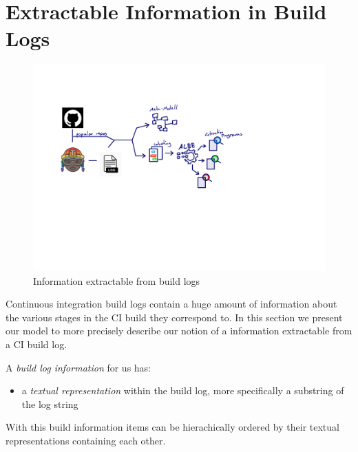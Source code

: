 \documentclass[\myrootdir/main.tex]{subfiles}
\begin{document}
\section{Extractable Information in Build Logs}
\begin{figure}[h]
  \centering
\includegraphics[page=2, width=\textwidth, trim={0.5cm 0.5cm 0.5cm 0.5cm}, clip]{img/flow-of-research.pdf}
  \caption{Information extractable from build logs}
  \label{fig:build-log-information-draft}
\end{figure}
Continuous integration build logs contain a huge amount of information about the various stages in the CI build they correspond to. In this section we present our model to more precisely describe our notion of a information extractable from a CI build log.

A \emph{build log information} for us has:
\begin{itemize}
	\item a \emph{textual representation} within the build log, more specifically a substring of the log string
\end{itemize}
With this build information items can be hierachically ordered by their textual representations containing each other.
\end{document}
